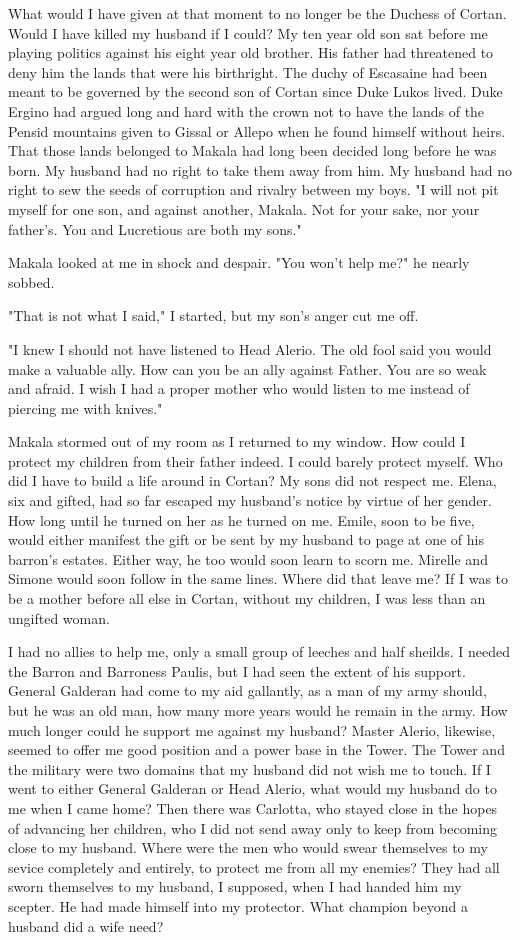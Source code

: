 \documentclass{article}
\begin{document}
What would I have given at that moment to no longer be the Duchess of Cortan. Would I have killed my husband if I could? My ten year old son sat before me playing politics against his eight year old brother. His father had threatened to deny him the lands that were his birthright. The duchy of Escasaine had been meant to be governed by the second son of Cortan since Duke Lukos lived. Duke Ergino had argued long and hard with the crown not to have the lands of the Pensid mountains given to Gissal or Allepo when he found himself without heirs. That those lands belonged to Makala had long been decided long before he was born. My husband had no right to take them away from him. My husband had no right to sew the seeds of corruption and rivalry between my boys. "I will not pit myself for one son, and against another, Makala. Not for your sake, nor your father's. You and Lucretious are both my sons."

Makala looked at me in shock and despair. "You won't help me?" he nearly sobbed.

"That is not what I said,"  I started, but my son's anger cut me off.

"I knew I should not have listened to Head Alerio. The old fool said you would make a valuable ally. How can you be an ally against Father. You are so weak and afraid. I wish I had a proper mother who would listen to me instead of piercing me with knives."

Makala stormed out of my room as I returned to my window. How could I protect my children from their father indeed. I could barely protect myself. Who did I have to build a life around in Cortan? My sons did not respect me. Elena, six and gifted, had so far escaped my husband's notice by virtue of her gender. How long until he turned on her as he turned on me. Emile, soon to be five, would either manifest the gift or be sent by my husband to page at one of his barron's estates. Either way, he too would soon learn to scorn me. Mirelle and Simone would soon follow in the same lines. Where did that leave me?
If I was to be a mother before all else in Cortan, without my children, I was less than an ungifted woman.

I had no allies to help me, only a small group of leeches and half sheilds. I needed the Barron and Barroness Paulis, but I had seen the extent of his support. General Galderan had come to my aid gallantly, as a man of my army should, but he was an old man, how many more years would he remain in the army. How much longer could he support me against my husband? Master Alerio, likewise, seemed to offer me good position and a power base in the Tower. The Tower and the military were two domains that my husband did not wish me to touch. If I went to either General Galderan or Head Alerio, what would my husband do to me when I came home? Then there was Carlotta, who stayed close in the hopes of advancing her children, who I did not send away only to keep from becoming close to my husband. Where were the men who would swear themselves to my sevice completely and entirely, to protect me from all my enemies? They had all sworn themselves to my husband, I supposed, when I had handed him my scepter. He had made himself into my protector. What champion beyond a husband did a wife need?
\end{document}
